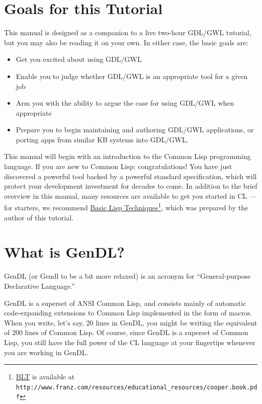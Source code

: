 \documentclass [11pt]{book}
\begin{document}
\section{Goals for this Tutorial}

\label{sec:goalsforthistutorial}

This manual is designed as a companion to a live two-hour GDL/GWL tutorial, but you may
also be reading it on your own. In either case, the basic goals are:

\begin{itemize}

\item Get you excited about using GDL/GWL

\item Enable you to judge whether GDL/GWL is an appropriate tool for a given job

\item Arm you with the ability to argue the case for using GDL/GWL when appropriate

\item Prepare you to begin maintaining and authoring GDL/GWL applications, or porting apps
from similar KB systems into GDL/GWL.

\end{itemize}

This manual will begin with an introduction to the Common Lisp programming language. If you are new to Common Lisp:
congratulations! You have just discovered a powerful tool backed by a
powerful standard specification, which will protect your development
investment for decades to come. In addition to the brief overview in
this manual, many resources are available to get you started in CL ---
for starters, we recommend 
\underline{Basic Lisp Techniques}\footnote{
\underline{BLT} is available at \texttt{http://www.franz.com/resources/educational\_resources/cooper.book.pdf}}, which was prepared by the author of this tutorial. 

\section{What is GenDL?}

\label{sec:whatisgendl?}

GenDL (or Gendl to be a bit more relaxed) is an acronym for
``General-purpose Declarative Language.'' 

GenDL is a superset of ANSI Common Lisp, and consists mainly of
automatic code-expanding extensions to Common Lisp implemented in the
form of macros. When you write, let's say, 20 lines in GenDL, you
might be writing the equivalent of 200 lines of Common Lisp. Of
course, since GenDL is a superset of Common Lisp, you still have the
full power of the CL language at your fingertips whenever you are
working in GenDL.
\end{document}
